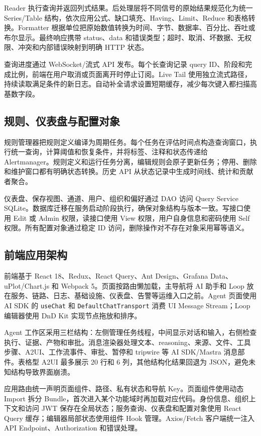 \documentclass[conference,10pt]{IEEEtran}
\newcommand{\code}[1]{\texttt{#1}}
\begin{document}
Reader 执行查询并返回列式结果。后处理层将不同信号的原始结果规范化为统一 Series/Table 结构，依次应用公式、缺口填充、Having、Limit、Reduce 和表格转换。Formatter 根据单位把原始数值转换为时间、字节、数据率、百分比、吞吐或布尔显示。最终响应携带 status、data 和错误类型；超时、取消、坏数据、无权限、冲突和内部错误映射到明确 HTTP 状态。

查询进度通过 WebSocket/流式 API 发布。每个长查询记录 query ID、阶段和完成比例，前端在用户取消或页面离开时停止订阅。Live Tail 使用独立流式路径，持续读取满足条件的新日志。自动补全请求设置短期缓存，减少每次键入都扫描高基数字段。

\subsection{规则、仪表盘与配置对象}

规则管理器把规则定义编译为周期任务。每个任务在评估时间点构造查询窗口，执行统一查询，计算阈值和恢复条件，并将标签、注释和状态传递给 Alertmanager。规则定义和运行任务分离，编辑规则会原子更新任务；停用、删除和维护窗口都有明确状态转换。历史 API 从状态记录中生成时间线、统计和贡献者聚合。

仪表盘、保存视图、通道、用户、组织和偏好通过 DAO 访问 Query Service SQLite。数据库迁移在服务启动阶段执行，确保对象结构与版本一致。写接口使用 Edit 或 Admin 权限，读接口使用 View 权限，用户自身信息和密码使用 Self 权限。所有配置对象通过稳定 ID 访问，删除操作对不存在对象采用幂等语义。

\subsection{前端应用架构}

前端基于 React 18、Redux、React Query、Ant Design、Grafana Data、uPlot/Chart.js 和 Webpack 5。页面按路由懒加载，主导航将 AI 助手和 Loop 放在服务、链路、日志、基础设施、仪表盘、告警等运维入口之前。Agent 页面使用 AI SDK 的 \code{useChat} 和 \code{DefaultChatTransport} 消费 UI Message Stream；Loop 编辑器使用 DnD Kit 实现节点拖放和排序。

Agent 工作区采用三栏结构：左侧管理任务线程，中间显示对话和输入，右侧检查执行、证据、产物和审批。消息渲染器处理文本、reasoning、来源、文件、工具步骤、A2UI、工作流事件、审批、暂停和 tripwire 等 AI SDK/Mastra 消息部件。表格型 A2UI 最多展示 20 行和 6 列，其他结构化结果回退为 JSON，避免未知结构导致界面崩溃。

应用路由统一声明页面组件、路径、私有状态和导航 Key。页面组件使用动态 Import 拆分 Bundle，首次进入某个功能域时再加载对应代码。身份信息、组织上下文和访问 JWT 保存在全局状态；服务查询、仪表盘和配置对象使用 React Query 缓存；编辑器局部状态使用组件 Hook 管理。Axios/Fetch 客户端统一注入 API Endpoint、Authorization 和错误处理。
\end{document}
